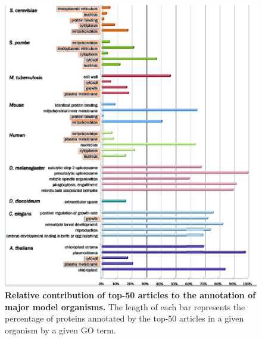 \documentclass[12pt]{article}
\begin{document}
\begin{figure}[!ht]
\begin{center}
\includegraphics[width=6in]{rel-contrib.eps}
\end{center}
\caption{
{\bf Relative contribution of top-50 articles to the annotation of major model organisms.}  
The length of each bar represents the percentage of proteins annotated by the top-50 articles in a
given organism by a given GO term.
}
\label{fig:rel-contrib}
\end{figure}
\newpage
\end{document}
